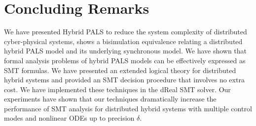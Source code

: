 
\section{Concluding Remarks}
\label{sec:concl}

We have presented Hybrid PALS to reduce the system complexity of distributed cyber-physical systems,
shows a bisimulation equivalence relating a distributed hybrid PALS model and its underlying synchronous model. 
We have shown that formal analysis problems of hybrid PALS models can be effectively expressed as SMT formulas.
We have presented an extended logical theory for distributed hybrid systems and provided an SMT decision procedure that involves no extra cost.
We have implemented these techniques in the dReal SMT solver. Our experiments have shown that our techniques dramatically increase the performance of SMT analysis for distributed hybrid systems with multiple control modes and nonlinear ODEs up to precision $\delta$.
